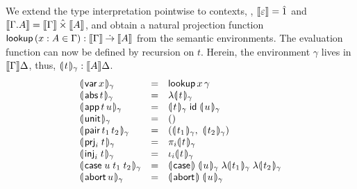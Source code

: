 \documentclass[sigplan,screen,fleqn,review]{acmart} %
\begin{document}
We extend the type interpretation pointwise to contexts, \ie,
$\den \cempty = \hatone$ and
$\den{\cext \Gamma A} = \den \Gamma \hattimes \den A$,
and obtain a natural projection function
$\tlookup\,(x : A \in \Gamma) : \den \Gamma \todot \den A$
from the semantic environments.
The evaluation function
can now be defined by recursion on $t$.
Herein, the environment $\gamma$ lives in $\den \Gamma \Delta$, thus, $\dent t \gamma : \den A \Delta$.
\[
\begin{array}{lcl}
  \dent{\tvar\,x}\gamma & = & \tlookup\,x\,\gamma \\
  \dent{\tabs\,t}\gamma & = & \fdent t \gamma \\
  \dent{\tapp\,t\,u} \gamma & = &
     \dent t \gamma\;\tid\;\dent u \gamma \\
  \dent{\tunit}\gamma & = & \ttempty \\
  \dent{\tpair\,t_1\,t_2}\gamma & = &
    (\dent{t_1}\gamma,\ \dent{t_2}\gamma) \\
  \dent{\prj i t}\gamma & = & \pi_i \dent t \gamma \\
  \dent{\inj i t}\gamma & = & \iota_i \dent t \gamma \\
  \dent{\tcase\;u\;t_1\;t_2}\gamma & = &
     \dencase\;\dent u \gamma\;\fdent{t_1}\gamma\;\fdent{t_2}\gamma \\
  \dent{\tabort\,u}\gamma & = & \denabort\;\dent u \gamma \\
\end{array}
\]
\end{document}
